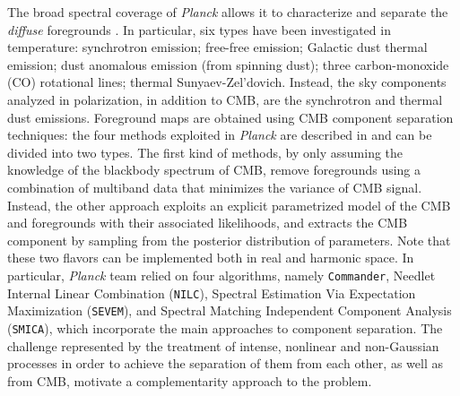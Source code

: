 The broad spectral coverage of \textit{Planck} allows it to characterize and separate the \emph{diffuse} foregrounds \citep{PlanckCollaboration2015e}. In particular, six types have been investigated in temperature: synchrotron emission; free-free emission; Galactic dust thermal emission; dust anomalous emission (from spinning dust); three carbon-monoxide (CO) rotational lines; thermal Sunyaev-Zel'dovich. Instead, the sky components analyzed in polarization, in addition to \gls{CMB}, are the synchrotron and thermal dust emissions. Foreground maps are obtained using \gls{CMB} component separation techniques: the four methods exploited in \textit{Planck} are described in \citet{PlanckCollaboration2015f} and can be divided into two types. The first kind of methods, by only assuming the knowledge of the blackbody spectrum of \gls{CMB}, remove foregrounds using a combination of multiband data that minimizes the variance of \gls{CMB} signal. Instead, the other approach exploits an explicit parametrized model of the \gls{CMB} and foregrounds with their associated likelihoods, and extracts the \gls{CMB} component by sampling from the posterior distribution of parameters. Note that these two flavors can be implemented both in real and harmonic space. In particular, \textit{Planck} team relied on four algorithms, namely \texttt{Commander}, Needlet Internal Linear Combination (\texttt{NILC}), Spectral Estimation Via Expectation Maximization (\texttt{SEVEM}), and Spectral Matching Independent Component Analysis (\texttt{SMICA}), which incorporate the main approaches to component separation. The challenge represented by the treatment of intense, nonlinear and non-Gaussian processes in order to achieve the separation of them from each other, as well as from \gls{CMB}, motivate a complementarity approach to the problem. 

